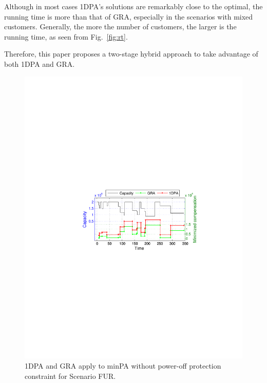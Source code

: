 Although in most cases {\sc 1DPA}'s solutions are remarkably close to the optimal, the running time is more than that of {\sc GRA}, especially in the scenarios with mixed customers. Generally, the more the number of customers, the larger is the running time, as seen from Fig.~\ref{fig:rt}.

Therefore, this paper proposes a two-stage hybrid approach to take advantage of both {\sc 1DPA} and {\sc GRA}.
\begin{figure}[!htb]
	\begin{center}
		\includegraphics[scale=0.6]{fig/minpaac.pdf}
	\end{center}\vspace{-5pt}
\caption{{\sc 1DPA} and {\sc GRA} apply to {\sc minPA} without power-off protection constraint for Scenario FUR.}
	\label{fig:minpaac}
\end{figure}


